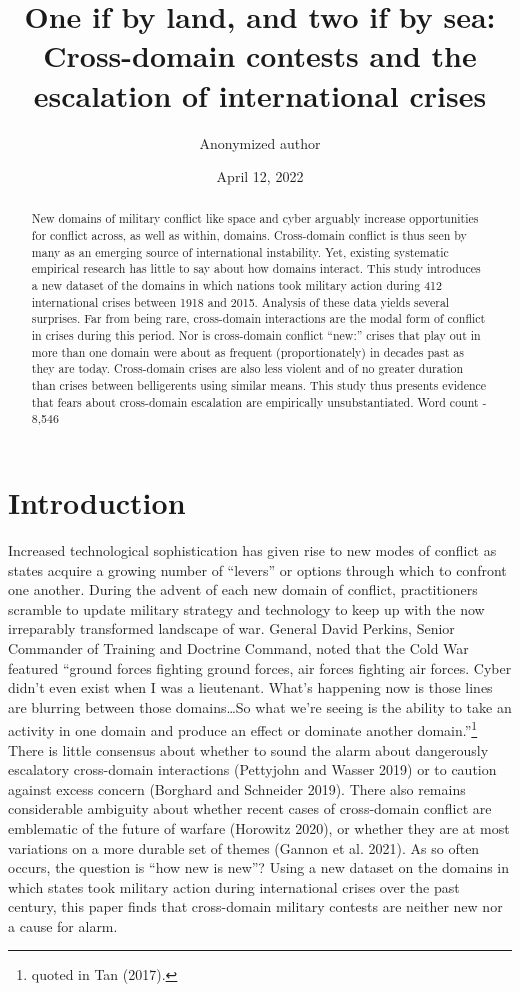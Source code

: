 \documentclass[
]{article}
\title{\singlespacing One if by land, and two if by sea: Cross-domain contests and the escalation of international crises}
\author{Anonymized author}
\date{April 12, 2022}
\begin{document}
\maketitle
\begin{abstract}
\singlespacing \noindent New domains of military conflict like space and cyber arguably increase opportunities for conflict across, as well as within, domains. Cross-domain conflict is thus seen by many as an emerging source of international instability. Yet, existing systematic empirical research has little to say about how domains interact. This study introduces a new dataset of the domains in which nations took military action during 412 international crises between 1918 and 2015. Analysis of these data yields several surprises. Far from being rare, cross-domain interactions are the modal form of conflict in crises during this period. Nor is cross-domain conflict ``new:'' crises that play out in more than one domain were about as frequent (proportionately) in decades past as they are today. Cross-domain crises are also less violent and of no greater duration than crises between belligerents using similar means. This study thus presents evidence that fears about cross-domain escalation are empirically unsubstantiated. \linebreak \linebreak Word count - 8,546
\end{abstract}

\newpage

\hypertarget{introduction}{%
\section{Introduction}\label{introduction}}

Increased technological sophistication has given rise to new modes of conflict as states acquire a growing number of ``levers'' or options through which to confront one another. During the advent of each new domain of conflict, practitioners scramble to update military strategy and technology to keep up with the now irreparably transformed landscape of war. General David Perkins, Senior Commander of Training and Doctrine Command, noted that the Cold War featured ``ground forces fighting ground forces, air forces fighting air forces. Cyber didn't even exist when I was a lieutenant. What's happening now is those lines are blurring between those domains\ldots So what we're seeing is the ability to take an activity in one domain and produce an effect or dominate another domain.''\footnote{quoted in Tan (2017).} There is little consensus about whether to sound the alarm about dangerously escalatory cross-domain interactions (Pettyjohn and Wasser 2019) or to caution against excess concern (Borghard and Schneider 2019). There also remains considerable ambiguity about whether recent cases of cross-domain conflict are emblematic of the future of warfare (Horowitz 2020), or whether they are at most variations on a more durable set of themes (Gannon et al. 2021). As so often occurs, the question is ``how new is new''? Using a new dataset on the domains in which states took military action during international crises over the past century, this paper finds that cross-domain military contests are neither new nor a cause for alarm.
\end{document}
